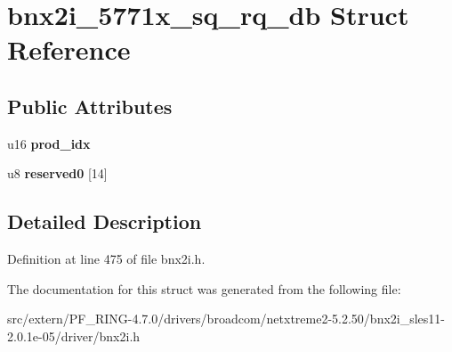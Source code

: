 \hypertarget{structbnx2i__5771x__sq__rq__db}{
\section{bnx2i\_\-5771x\_\-sq\_\-rq\_\-db Struct Reference}
\label{structbnx2i__5771x__sq__rq__db}
}
\subsection*{Public Attributes}
\begin{DoxyCompactItemize}
\item 
\hypertarget{structbnx2i__5771x__sq__rq__db_af31a845bf3cea49f71838cc66df5483b}{
u16 {\bfseries prod\_\-idx}}
\label{structbnx2i__5771x__sq__rq__db_af31a845bf3cea49f71838cc66df5483b}

\item 
\hypertarget{structbnx2i__5771x__sq__rq__db_a302dcd0079ffa05494a3f804d2bed362}{
u8 {\bfseries reserved0} \mbox{[}14\mbox{]}}
\label{structbnx2i__5771x__sq__rq__db_a302dcd0079ffa05494a3f804d2bed362}

\end{DoxyCompactItemize}


\subsection{Detailed Description}


Definition at line 475 of file bnx2i.h.



The documentation for this struct was generated from the following file:\begin{DoxyCompactItemize}
\item 
src/extern/PF\_\-RING-\/4.7.0/drivers/broadcom/netxtreme2-\/5.2.50/bnx2i\_\-sles11-\/2.0.1e-\/05/driver/bnx2i.h\end{DoxyCompactItemize}
